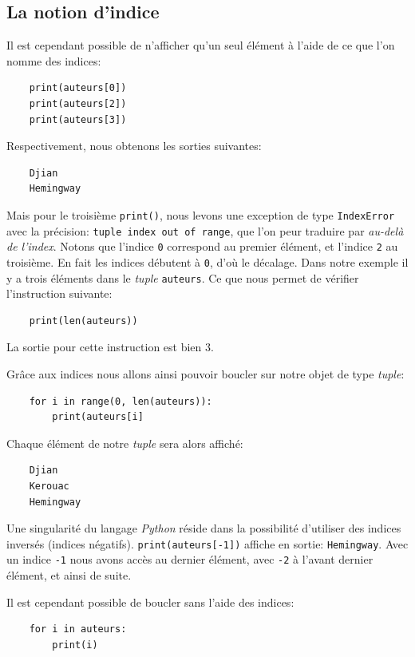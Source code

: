 \documentclass[a4paper,11pt]{book}
\begin{document}
\subsection*{La notion d'indice}
Il est cependant possible de n'afficher qu'un seul élément à l'aide de ce que l'on nomme des indices:
\begin{verbatim}
    print(auteurs[0])
    print(auteurs[2])
    print(auteurs[3])
\end{verbatim}
\medskip

Respectivement, nous obtenons les sorties suivantes:
\begin{verbatim}
    Djian
    Hemingway
\end{verbatim}
\medskip

Mais pour le troisième \texttt{print()}, nous levons une exception de type \texttt{IndexError} avec la précision: \texttt{tuple index out of range}, que l'on peur traduire par \textit{au-delà de l'index}. Notons que l'indice \texttt{0} correspond au premier élément, et l'indice \texttt{2} au troisième. En fait les indices débutent à \texttt{0}, d'où le décalage. Dans notre exemple il y a trois éléments dans le \textit{tuple} \texttt{auteurs}. Ce que nous permet de vérifier l'instruction suivante:
\begin{verbatim}
    print(len(auteurs))
\end{verbatim}
\medskip

La sortie pour cette instruction est bien 3.
\medskip

Grâce aux indices nous allons ainsi pouvoir boucler sur notre objet de type \textit{tuple}:
\begin{verbatim}
    for i in range(0, len(auteurs)):
        print(auteurs[i]
\end{verbatim}
\medskip

Chaque élément de notre \textit{tuple} sera alors affiché:
\begin{verbatim}
    Djian
    Kerouac
    Hemingway
\end{verbatim}
\medskip

Une singularité du langage \textit{Python} réside dans la possibilité d'utiliser des indices inversés (indices négatifs). \texttt{print(auteurs[-1])} affiche en sortie: \texttt{Hemingway}. Avec un indice \texttt{-1} nous avons accès au dernier élément, avec \texttt{-2} à l'avant dernier élément, et ainsi de suite.
\medskip

Il est cependant possible de boucler sans l'aide des indices:
\begin{verbatim}
    for i in auteurs:
        print(i)
\end{verbatim}
\medskip
\end{document}
